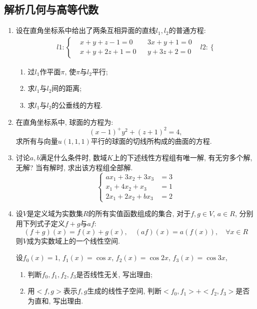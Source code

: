 \documentclass[12pt,a4paper,openany]{book}
\begin{document}
\subsection{解析几何与高等代数}
\begin{enumerate}
\item 设在直角坐标系中给出了两条互相异面的直线$l_1, l_2$的普通方程:
\[
\begin{array}{cc}
l1: \left\{
\begin{aligned}
&x + y + z - 1 = 0 \\
&x + y + 2z + 1 = 0
\end{aligned}
\begin{aligned}
&3x + y + 1 = 0 \\
&y + 3z + 2 = 0
\end{aligned}
\right.
&
l2: \left\{
\right.
\end{array}
\]
\begin{enumerate}
\item 过$l_1$作平面$\pi$, 使$\pi$与$l_2$平行;
\item 求$l_1$与$l_2$间的距离;
\item 求$l_1$与$l_2$的公垂线的方程.
\end{enumerate}

\item 在直角坐标系中, 球面的方程为:
\[
(x - 1)^ + y^2 + (z + 1)^2 = 4,
\]
求所有与向量$u(1, 1, 1)$平行的球面的切线所构成的曲面的方程.

\item 讨论$a, b$满足什么条件时, 数域$K$上的下述线性方程组有唯一解, 有无穷多个解, 无解? 当有解时, 求出该方程组全部解.
\[
\left\{
\begin{aligned}
ax_1 + 3x_2 + 3x_3 &= 3 \\
x_1 + 4x_2 + x_3 &= 1 \\
2x_1 + 2x_2 + bx_3 &= 2
\end{aligned}
\right.
\]

\item 设$V$是定义域为实数集$R$的所有实值函数组成的集合, 对于$f, g \in V$, $a \in R$, 分别用下列式子定义$f + g$与$af$:
\[
(f + g)(x) = f(x) + g(x), \quad (af)(x) = a(f(x)), \quad \forall x \in R
\]
则$V$成为实数域上的一个线性空间.

设$f_0(x) = 1$, $f_1(x) = \cos{x}$, $f_2(x) = \cos{2x}$, $f_3(x) = \cos{3x}$,

\begin{enumerate}
\item 判断$f_0, f_1, f_2, f_3$是否线性无关, 写出理由;
\item 用$<f, g>$表示$f, g$生成的线性子空间, 判断$<f_0, f_1> + <f_2, f_3>$是否为直和, 写出理由.
\end{enumerate}


\end{enumerate}
\end{document}
